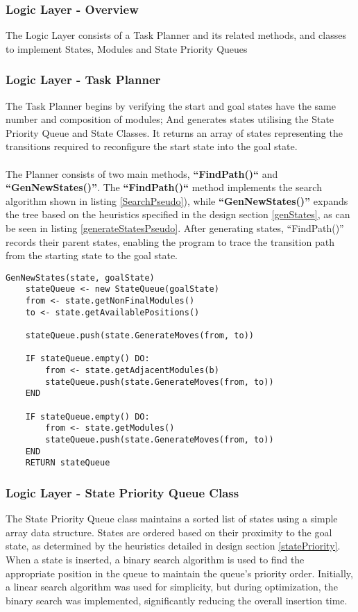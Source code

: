 \subsubsection{Logic Layer - Overview}
The Logic Layer consists of a Task Planner and its related methods, and classes to implement States, Modules and State Priority Queues

\subsubsection{Logic Layer - Task Planner}
The Task Planner begins by verifying the start and goal states have the same number and composition of modules; And generates states utilising the State Priority Queue and State Classes. It returns an array of states representing the transitions required to reconfigure the start state into the goal state.
\\\\
The Planner consists of two main methods, \textbf{“FindPath()“} and \textbf{“GenNewStates()”}. The \textbf{“FindPath()“} method implements the search algorithm shown in listing \ref{SearchPseudo}), while \textbf{“GenNewStates()”} expands the tree based on the heuristics specified in the design section \ref{genStates}, as can be seen in listing \ref{generateStatesPseudo}. After generating states, “FindPath()” records their parent states, enabling the program to trace the transition path from the starting state to the goal state.

\begin{lstlisting}[caption={State Generation Pseudo-code},captionpos=b,label={generateStatesPseudo}]
GenNewStates(state, goalState)
	stateQueue <- new StateQueue(goalState) 
	from <- state.getNonFinalModules()
	to <- state.getAvailablePositions()
	
	stateQueue.push(state.GenerateMoves(from, to))
	
	IF stateQueue.empty() DO:
		from <- state.getAdjacentModules(b)
		stateQueue.push(state.GenerateMoves(from, to))
	END
	
	IF stateQueue.empty() DO:
		from <- state.getModules()
		stateQueue.push(state.GenerateMoves(from, to))
	END
	RETURN stateQueue
\end{lstlisting}

\subsubsection{Logic Layer - State Priority Queue Class}
The State Priority Queue class maintains a sorted list of states using a simple array data structure. States are ordered based on their proximity to the goal state, as determined by the heuristics detailed in design section \ref{statePriority}. When a state is inserted, a binary search algorithm \cite{lin2019binary} is used to find the appropriate position in the queue to maintain the queue's priority order. Initially, a linear search algorithm was used for simplicity, but during optimization, the binary search was implemented, significantly reducing the overall insertion time.

